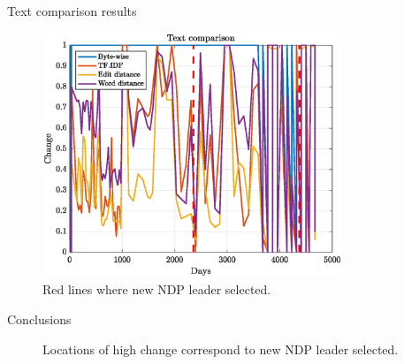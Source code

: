 \documentclass[10pt]{beamer}
\begin{document}
\begin{frame}{Text comparison results}
  \begin{figure}
    \centering
    \includegraphics[width = 0.8\textwidth]{text_comparison}
    \caption{Red lines where new NDP leader selected.}
  \end{figure}
\end{frame}

\begin{frame}{Conclusions}
\begin{figure}
\centering     %
{}
\caption{Locations of high change correspond to new NDP leader selected.}
\end{figure}
\end{frame}
\end{document}
